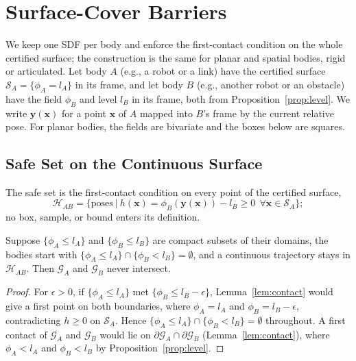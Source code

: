 \section{Surface-Cover Barriers}\label{sec:cover}
We keep one SDF per body and enforce the first-contact condition on the whole certified surface; the
construction is the same for planar and spatial bodies, rigid or articulated. Let body $A$ (e.g., a
robot or a link) have the certified surface $\mathcal S_A=\{\phi_A=l_A\}$ in its frame, and let body $B$
(e.g., another robot or an obstacle) have the field $\phi_B$ and level $l_B$ in its frame, both from
Proposition~\ref{prop:level}. We write $\mathbf y(\mathbf x)$ for a point $\mathbf x$ of $A$ mapped into
$B$'s frame by the current relative pose. For planar bodies, the fields are bivariate and the boxes
below are squares.

\subsection{Safe Set on the Continuous Surface}
The safe set is the first-contact condition on every point of the certified surface,
\begin{equation}\label{eq:safe}
\mathcal H_{AB}=\big\{\text{poses}\ \big|\ h(\mathbf x)=\phi_B(\mathbf y(\mathbf x))-l_B\ge0\ \ \forall\mathbf x\in\mathcal S_A\big\};
\end{equation}
no box, sample, or bound enters its definition.
\begin{theorem}\label{thm:cover}
Suppose $\{\phi_A\le l_A\}$ and $\{\phi_B\le l_B\}$ are compact subsets of their domains, the bodies
start with $\{\phi_A\le l_A\}\cap\{\phi_B<l_B\}=\emptyset$, and a continuous trajectory stays in
$\mathcal H_{AB}$. Then $\mathcal G_A$ and $\mathcal G_B$ never intersect.
\end{theorem}
\begin{proof}
For $\epsilon>0$, if $\{\phi_A\le l_A\}$ met $\{\phi_B\le l_B-\epsilon\}$, Lemma~\ref{lem:contact} would
give a first point on both boundaries, where $\phi_A=l_A$ and $\phi_B=l_B-\epsilon$, contradicting
$h\ge0$ on $\mathcal S_A$. Hence $\{\phi_A\le l_A\}\cap\{\phi_B<l_B\}=\emptyset$ throughout. A first
contact of $\mathcal G_A$ and $\mathcal G_B$ would lie on $\partial\mathcal G_A\cap\partial\mathcal G_B$
(Lemma~\ref{lem:contact}), where $\phi_A<l_A$ and $\phi_B<l_B$ by Proposition~\ref{prop:level}.
\end{proof}

